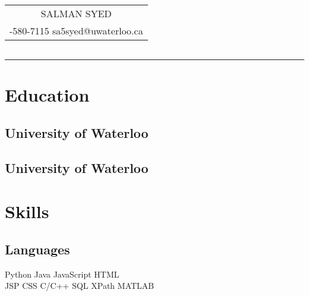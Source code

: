 \documentclass[letterpaper]{deedy-resume}
\begin{document}
\sffamily

\hfill
{\Huge\bfseries\begin{tabular}[c]{c}
\vspace*{-0.6cm}
SALMAN SYED\\
\fontsize{9}{0}
\selectfont
519-580-7115  \textbullet{} sa5syed@uwaterloo.ca
\end{tabular}}\hfill
{\small\bfseries\begin{tabular}[c]{c}

\end{tabular}}\hfill

\noindent\rule{7.5in}{0.4pt}

\begin{minipage}[t]{0.33\textwidth}

\section{Education} 

\subsection{University of Waterloo}


\sectionspace

\subsection{University of Waterloo}


\sectionspace

\section{Skills}

\subsection{Languages}

Python \textbullet{} Java \textbullet{} JavaScript \textbullet{} HTML \\
JSP \textbullet{} CSS \textbullet{} C/C++ \textbullet{} SQL \textbullet{} XPath \textbullet{} MATLAB \\ 


\end{minipage}
\end{document}
